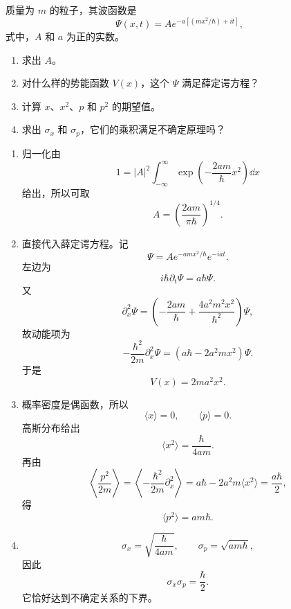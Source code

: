 \begin{question}
质量为 $m$ 的粒子，其波函数是
\[
\Psi(x,t)=A e^{-a[(mx^2/\hbar)+it]},
\]
式中，$A$ 和 $a$ 为正的实数。
\begin{enumerate}
\item 求出 $A$。
\item 对什么样的势能函数 $V(x)$，这个 $\Psi$ 满足薛定谔方程？
\item 计算 $x$、$x^2$、$p$ 和 $p^2$ 的期望值。
\item 求出 $\sigma_x$ 和 $\sigma_p$，它们的乘积满足不确定原理吗？
\end{enumerate}
\end{question}
\begin{solution}
\begin{enumerate}
\item 归一化由
\[
1=|A|^2\int_{-\infty}^{\infty}\exp\left(-\frac{2am}{\hbar}x^2\right)\dd x
\]
给出，所以可取
\[
A=\left(\frac{2am}{\pi\hbar}\right)^{1/4}.
\]
\item 直接代入薛定谔方程。记
\[
\Psi=Ae^{-amx^2/\hbar}e^{-iat}.
\]
左边为
\[
i\hbar\partial_t\Psi=a\hbar\Psi.
\]
又
\[
\partial_x^2\Psi=\left(-\frac{2am}{\hbar}+\frac{4a^2m^2x^2}{\hbar^2}\right)\Psi,
\]
故动能项为
\[
-\frac{\hbar^2}{2m}\partial_x^2\Psi=(a\hbar-2a^2mx^2)\Psi.
\]
于是
\[
V(x)=2ma^2x^2.
\]
\item 概率密度是偶函数，所以
\[
\langle x\rangle=0,\qquad \langle p\rangle=0.
\]
高斯分布给出
\[
\langle x^2\rangle=\frac{\hbar}{4am}.
\]
再由
\[
\left\langle \frac{p^2}{2m}\right\rangle
=\left\langle -\frac{\hbar^2}{2m}\partial_x^2\right\rangle
=a\hbar-2a^2m\langle x^2\rangle=\frac{a\hbar}{2},
\]
得
\[
\langle p^2\rangle=am\hbar.
\]
\item
\[
\sigma_x=\sqrt{\frac{\hbar}{4am}},\qquad
\sigma_p=\sqrt{am\hbar},
\]
因此
\[
\sigma_x\sigma_p=\frac{\hbar}{2}.
\]
它恰好达到不确定关系的下界。
\end{enumerate}
\end{solution}


